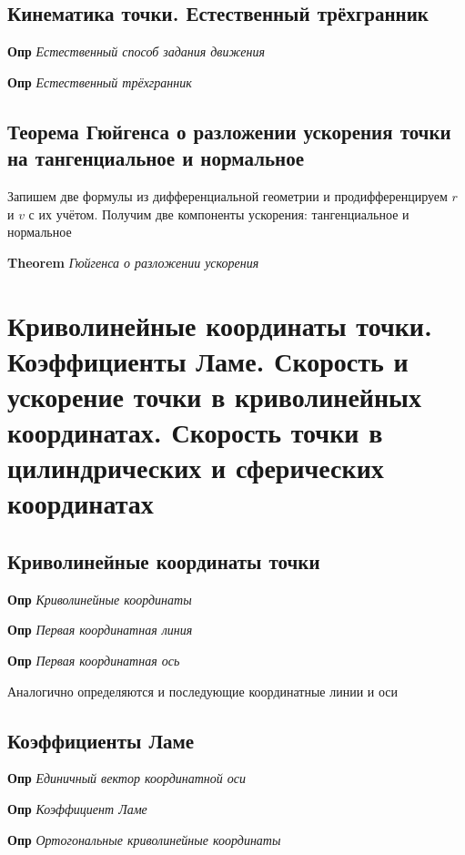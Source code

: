 \documentclass[a4paper, 14pt]{article}
\begin{document}
    \subsection{Кинематика точки. Естественный трёхгранник}
    
    \textbf{Опр} \textit{Естественный способ задания движения}
    
    \textbf{Опр} \textit{Естественный трёхгранник}
    
    \subsection{Теорема Гюйгенса о разложении ускорения точки на тангенциальное и нормальное}
    
    Запишем две формулы из дифференциальной геометрии и продифференцируем $r$ и $v$ с их учётом.
    Получим две компоненты ускорения: тангенциальное и нормальное
    
    \textbf{Theorem} \textit{Гюйгенса о разложении ускорения}
    
    \section{Криволинейные координаты точки.
    Коэффициенты Ламе.
    Скорость и ускорение точки в криволинейных координатах.
    Скорость точки в цилиндрических и сферических координатах}
    
    \subsection{Криволинейные координаты точки}
    
    \textbf{Опр} \textit{Криволинейные координаты}
    
    \textbf{Опр} \textit{Первая координатная линия}
    
    \textbf{Опр} \textit{Первая координатная ось}
    
    Аналогично определяются и последующие координатные линии и оси
    
    \subsection{Коэффициенты Ламе}
    
    \textbf{Опр} \textit{Единичный вектор координатной оси}
    
    \textbf{Опр} \textit{Коэффициент Ламе}
    
    \textbf{Опр} \textit{Ортогональные криволинейные координаты}
    
\end{document}
